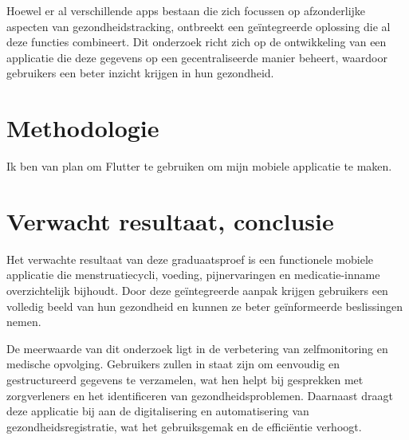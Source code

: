Hoewel er al verschillende apps bestaan die zich focussen op afzonderlijke aspecten van gezondheidstracking, ontbreekt een geïntegreerde oplossing die al deze functies combineert. Dit onderzoek richt zich op de ontwikkeling van een applicatie die deze gegevens op een gecentraliseerde manier beheert, waardoor gebruikers een beter inzicht krijgen in hun gezondheid.

\section{Methodologie}%
\label{sec:methodologie}
Ik ben van plan om Flutter te gebruiken om mijn mobiele applicatie te maken.
\section{Verwacht resultaat, conclusie}%
\label{sec:verwachte_resultaten}

Het verwachte resultaat van deze graduaatsproef is een functionele mobiele applicatie die menstruatiecycli, voeding, pijnervaringen en medicatie-inname overzichtelijk bijhoudt. Door deze geïntegreerde aanpak krijgen gebruikers een volledig beeld van hun gezondheid en kunnen ze beter geïnformeerde beslissingen nemen.

De meerwaarde van dit onderzoek ligt in de verbetering van zelfmonitoring en medische opvolging. Gebruikers zullen in staat zijn om eenvoudig en gestructureerd gegevens te verzamelen, wat hen helpt bij gesprekken met zorgverleners en het identificeren van gezondheidsproblemen. Daarnaast draagt deze applicatie bij aan de digitalisering en automatisering van gezondheidsregistratie, wat het gebruiksgemak en de efficiëntie verhoogt.